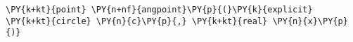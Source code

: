 \begin{Verbatim}[commandchars=\\\{\}]
    \PY{k+kt}{point} \PY{n+nf}{angpoint}\PY{p}{(}\PY{k}{explicit} \PY{k+kt}{circle} \PY{n}{c}\PY{p}{,} \PY{k+kt}{real} \PY{n}{x}\PY{p}{)}
\end{Verbatim}

